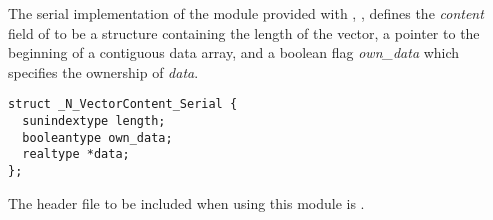 
The serial implementation of the {\nvector} module provided with {\sundials},
{\nvecs}, defines the {\em content} field of  to be a structure 
containing the length of the vector, a pointer to the beginning of a contiguous 
data array, and a boolean flag {\em own\_data} which specifies the ownership 
of {\em data}.
\begin{verbatim} 
struct _N_VectorContent_Serial {
  sunindextype length;
  booleantype own_data;
  realtype *data;
};
\end{verbatim}

The header file to be included when using this module is .

